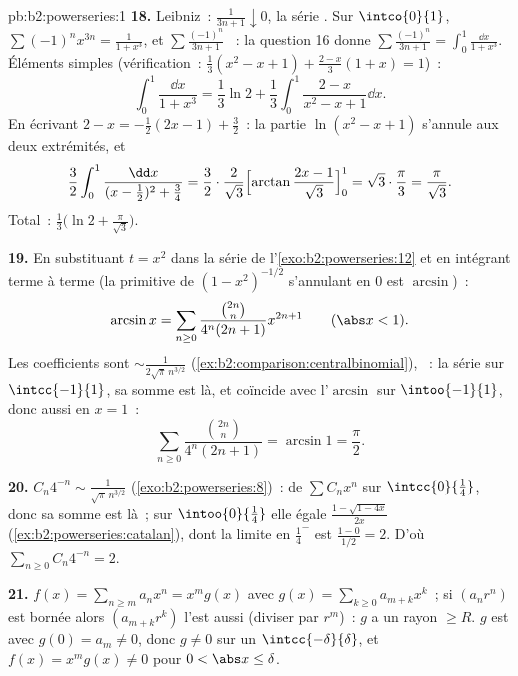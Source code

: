 \begin{solution}{pb:b2:powerseries:1}
\textbf{18.} Leibniz~: $\frac{1}{3n+1}\downarrow0$, la série
. Sur $\intco{0}{1}$, $\sum(-1)^nx^{3n} =
\frac{1}{1+x^3}$, et $\sum\frac{(-1)^n}{3n+1}$ ~:
la question 16 donne $\sum\frac{(-1)^n}{3n+1} =
\int_0^1\frac{\dd x}{1+x^3}$. Éléments simples (vérification~:
$\frac13(x^2-x+1) + \frac{2-x}{3}(1+x) = 1$)~:
\[
\int_0^1\frac{\dd x}{1+x^3}
= \frac13\ln2 + \frac13\int_0^1\frac{2-x}{x^2-x+1}\dd x .
\]
En écrivant $2 - x = -\frac12(2x-1) + \frac32$~: la partie $\ln(x^2-x+1)$
s'annule aux deux extrémités, et
\[
\frac32\int_0^1\frac{\dd x}{(x-\frac12)^2 + \frac34}
= \frac32\cdot\frac{2}{\sqrt3}
\Bigl[\arctan\frac{2x-1}{\sqrt3}\Bigr]_0^1
= \sqrt3\cdot\frac{\pi}{3} = \frac{\pi}{\sqrt3} .
\]
Total~: $\frac13\bigl(\ln2 + \frac{\pi}{\sqrt3}\bigr)$.

\textbf{19.} En substituant $t = x^2$ dans la série de
l'\cref{exo:b2:powerseries:12} et en intégrant terme à
terme (la primitive de $(1-x^2)^{-1/2}$ s'annulant en $0$ est
$\arcsin$)~:
\[
\arcsin x = \sum_{n\geq0}
\frac{\binom{2n}n}{4^n(2n+1)}x^{2n+1}
\qquad(\abs x < 1) .
\]
Les coefficients sont $\sim \frac{1}{2\sqrt\pi\,n^{3/2}}$
(\cref{ex:b2:comparison:centralbinomial}), ~: la série
 \emph{} sur $\intcc{-1}{1}$, sa somme est
 là, et coïncide avec l'$\arcsin$ 
sur $\intoo{-1}{1}$, donc aussi en $x = 1$~:
\[
\sum_{n\geq0}\frac{\binom{2n}n}{4^n(2n+1)}
= \arcsin 1 = \frac\pi2 .
\]

\textbf{20.} $C_n4^{-n} \sim \frac{1}{\sqrt\pi\,n^{3/2}}$
(\cref{exo:b2:powerseries:8})~:  de $\sum
C_nx^n$ sur $\intcc{0}{\frac14}$, donc sa somme est 
là~; sur $\intoo{0}{\frac14}$ elle égale
$\frac{1-\sqrt{1-4x}}{2x}$
(\cref{ex:b2:powerseries:catalan}), dont la limite en
$\frac14^-$ est $\frac{1-0}{1/2} = 2$. D'où $\sum_{n\geq0}
C_n4^{-n} = 2$.

\textbf{21.} $f(x) = \sum_{n\geq m}a_nx^n = x^m g(x)$ avec
$g(x) = \sum_{k\geq0}a_{m+k}x^k$~; si $(a_nr^n)$ est bornée alors
$(a_{m+k}r^k)$ l'est aussi (diviser par $r^m$)~: $g$ a un rayon $\geq
R$. $g$ est  avec $g(0) = a_m \neq 0$, donc $g \neq 0$
sur un $\intcc{-\delta}{\delta}$, et $f(x) = x^mg(x) \neq 0$
pour $0 < \abs x \leq \delta$.


\end{solution}
